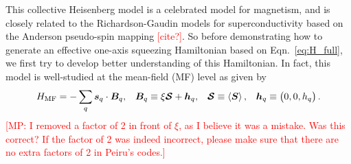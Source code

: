 \documentclass[aps,notitlepage,nofootinbib,11pt]{revtex4-1}
\renewcommand{\t}{\text} %
\newcommand{\p}[1]{\left(#1\right)} %
\renewcommand{\v}{\bm} %
\renewcommand{\c}{\cdot} %
\newcommand{\bk}{\braket} %
\newcommand{\1}{\hat{\mathds{1}}}
\newcommand{\note}[1]{\textcolor{red}{#1}}
\begin{document}
This collective Heisenberg model is a celebrated model for magnetism,
and is closely related to the Richardson-Gaudin models for
superconductivity based on the Anderson pseudo-spin mapping
\note{[cite?]}.  So before demonstrating how to generate an effective
one-axis squeezing Hamiltonian based on Eqn.~\eqref{eq:H_full}, we
first try to develop better understanding of this Hamiltonian.  In
fact, this model is well-studied at the mean-field (MF) level as given
by
\begin{align}
  H_{\t{MF}} = -\sum_q \v s_q \c \v B_q,
  &&
  \v B_q \equiv \xi\v{\mathcal S} + \v h_q,
  &&
  \v{\mathcal S} \equiv \bk{\v S},
  &&
  \v h_q \equiv \p{0,0,h_q}.
  \label{eq:mean_field}
\end{align}
\note{[MP: I removed a factor of 2 in front of $\xi$, as I believe it
  was a mistake.  Was this correct?  If the factor of 2 was indeed
  incorrect, please make sure that there are no extra factors of 2 in
  Peiru's codes.]}
\end{document}
